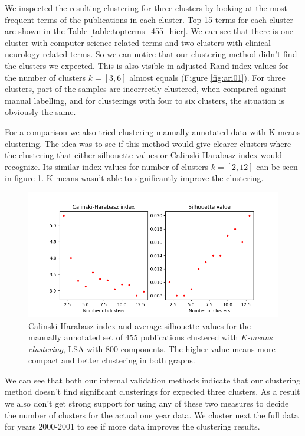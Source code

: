 We inspected the resulting clustering for three clusters by 
looking at the most frequent terms of the publications in each 
cluster. Top 15 terms for each cluster are shown in the Table 
\ref{table:topterms_455_hier}. We can see that there is one cluster
with computer science related terms and two clusters with clinical
neurology related terms. So we can notice that our clustering method
didn't find the clusters we expected. This is also visible in 
adjusted Rand index values for the number of clusters $k=[3,6]$ almost 
equals (Figure \ref{fig:ari01}). For three clusters, part of the 
samples are incorrectly clustered, when compared against manual
labelling, and for clusterings with four to six clusters, the 
situation is obviously the same.



For a comparison we also tried clustering manually annotated data
with K-means clustering. The idea was to see if this method would
give clearer clusters where the clustering that either silhouette values or 
Calinski-Harabasz index would recognize. Its similar
index values for number of clusters $k=[2,12]$ can be seen in 
figure \ref{fig:ch-silh02}. K-means wasn't able to significantly 
improve the clustering.

\begin{figure}[htp]
  \begin{center}    
\includegraphics[width=11.5cm]{images/c-h-silh-index-plot-455-2_12-800-kmeans.png}
    \caption{Calinski-Harabasz index and average silhouette values for the
    manually annotated set of 455 publications clustered with 
    \emph{K-means clustering}, LSA with 800 components. The higher
    value means more compact and better clustering in both graphs.}
    \label{fig:ch-silh02}
  \end{center}
\end{figure}

We can see that both our internal validation methods indicate that
our clustering method doesn't find significant clusterings for
expected three clusters.
As a result we also don't get strong support for using any of 
these two measures to decide the number of clusters for the actual 
one year data.
We cluster next the full data for years 2000-2001 to see if more 
data improves the clustering results.



